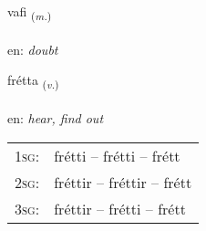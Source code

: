 \documentclass[frontgrid, backgrid]{flacards}\usepackage[]{graphicx}\usepackage[]{color}
\begin{document}
\renewcommand{\flhead}{\vskip5pt \fboxsep=0pt {\small\bfseries\footnotesize Nafnorð | Noun}}
\renewcommand{\fcfoot}{\vskip5pt \fboxsep=0pt \hspace{2pt}{\small\bfseries\footnotesize 2K}}

\renewcommand{\blhead}{\vskip5pt {\small\bfseries\footnotesize Nafnorð | Noun }}
\renewcommand{\bcfoot}{\vskip5pt \hspace{2pt}{\small\bfseries\footnotesize 2K}}


{vafi \small{\textsubscript{(\textit{m.})}} \\[1ex] %
\textphonetic{[vaːvɪ]} \\
en: \emph{doubt} \\  [2ex]
\renewcommand*{\arraystretch}{0.8}
}

\renewcommand{\flhead}{\vskip5pt \fboxsep=0pt {\small\bfseries\footnotesize Sagnorð | Verb}}
\renewcommand{\fcfoot}{\vskip5pt \fboxsep=0pt \hspace{2pt}{\small\bfseries\footnotesize 2K}}

\renewcommand{\blhead}{\vskip5pt {\small\bfseries\footnotesize Sagnorð | Verb }}
\renewcommand{\bcfoot}{\vskip5pt \hspace{2pt}{\small\bfseries\footnotesize 2K}}


{frétta \small{\textsubscript{(\textit{v.})}} \\[1ex] %
\textphonetic{[frjɛhta]} \\
en: \emph{hear, find out} \\  [2ex]
\renewcommand*{\arraystretch}{0.8}
\begin{tabular}{p{1cm}l}
\textsc{1sg}: & frétti -- frétti -- frétt \\ 
\textsc{2sg}: & fréttir -- fréttir -- frétt \\ 
\textsc{3sg}: & fréttir -- frétti -- frétt \\ 
\end{tabular}
}
\end{document}
